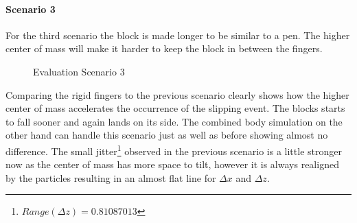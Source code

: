 \clearpage
\paragraph{Scenario 3}
For the third scenario the block is made longer to be similar to a pen. The higher center of mass will make it harder to keep the block in between the fingers.

\begin{figure}[htb]
	\setcounter{subfigure}{0}
	\centering
	\setcounter{subfigure}{0}
	\caption{Evaluation Scenario 3}
\end{figure}

Comparing the rigid fingers to the previous scenario clearly shows how the higher center of mass accelerates the occurrence of the slipping event. The blocks starts to fall sooner and again lands on its side. The combined body simulation on the other hand can handle this scenario just as well as before showing almost no difference. The small jitter\footnote{$Range(\Delta z)=0.81087013$} observed in the previous scenario is a little stronger now as the center of mass has more space to tilt, however it is always realigned by the particles resulting in an almost flat line for $\Delta x$ and $\Delta z$.

